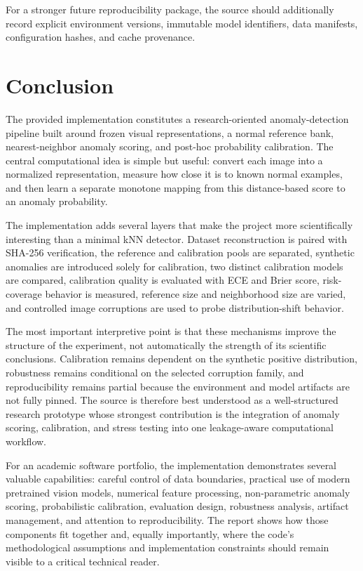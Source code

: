 \documentclass[
  11pt,
]{article}
\begin{document}
For a stronger future reproducibility package, the source should
additionally record explicit environment versions, immutable model
identifiers, data manifests, configuration hashes, and cache provenance.

\section{Conclusion}\label{conclusion}

The provided implementation constitutes a research-oriented
anomaly-detection pipeline built around frozen visual representations, a
normal reference bank, nearest-neighbor anomaly scoring, and post-hoc
probability calibration. The central computational idea is simple but
useful: convert each image into a normalized representation, measure how
close it is to known normal examples, and then learn a separate monotone
mapping from this distance-based score to an anomaly probability.

The implementation adds several layers that make the project more
scientifically interesting than a minimal kNN detector. Dataset
reconstruction is paired with SHA-256 verification, the reference and
calibration pools are separated, synthetic anomalies are introduced
solely for calibration, two distinct calibration models are compared,
calibration quality is evaluated with ECE and Brier score, risk-coverage
behavior is measured, reference size and neighborhood size are varied,
and controlled image corruptions are used to probe distribution-shift
behavior.

The most important interpretive point is that these mechanisms improve
the structure of the experiment, not automatically the strength of its
scientific conclusions. Calibration remains dependent on the synthetic
positive distribution, robustness remains conditional on the selected
corruption family, and reproducibility remains partial because the
environment and model artifacts are not fully pinned. The source is
therefore best understood as a well-structured research prototype whose
strongest contribution is the integration of anomaly scoring,
calibration, and stress testing into one leakage-aware computational
workflow.

For an academic software portfolio, the implementation demonstrates
several valuable capabilities: careful control of data boundaries,
practical use of modern pretrained vision models, numerical feature
processing, non-parametric anomaly scoring, probabilistic calibration,
evaluation design, robustness analysis, artifact management, and
attention to reproducibility. The report shows how those components fit together and,
equally importantly, where the code's methodological assumptions and implementation
constraints should remain visible to a critical technical reader.
\end{document}
